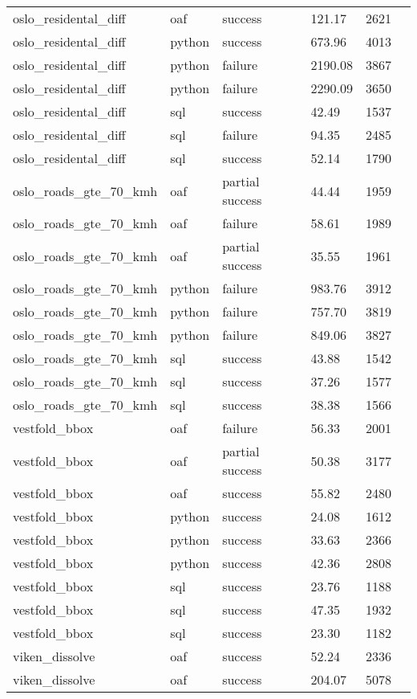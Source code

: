 \begin{longtable}{lp{1.8cm}p{1.8cm}p{1.8cm}p{1.8cm}p{1.8cm}}
oslo\_residental\_diff & oaf & success & 121.17 & 2621 \\
oslo\_residental\_diff & python & success & 673.96 & 4013 \\
oslo\_residental\_diff & python & failure & 2190.08 & 3867 \\
oslo\_residental\_diff & python & failure & 2290.09 & 3650 \\
oslo\_residental\_diff & sql & success & 42.49 & 1537 \\
oslo\_residental\_diff & sql & failure & 94.35 & 2485 \\
oslo\_residental\_diff & sql & success & 52.14 & 1790 \\
oslo\_roads\_gte\_70\_kmh & oaf & partial success & 44.44 & 1959 \\
oslo\_roads\_gte\_70\_kmh & oaf & failure & 58.61 & 1989 \\
oslo\_roads\_gte\_70\_kmh & oaf & partial success & 35.55 & 1961 \\
oslo\_roads\_gte\_70\_kmh & python & failure & 983.76 & 3912 \\
oslo\_roads\_gte\_70\_kmh & python & failure & 757.70 & 3819 \\
oslo\_roads\_gte\_70\_kmh & python & failure & 849.06 & 3827 \\
oslo\_roads\_gte\_70\_kmh & sql & success & 43.88 & 1542 \\
oslo\_roads\_gte\_70\_kmh & sql & success & 37.26 & 1577 \\
oslo\_roads\_gte\_70\_kmh & sql & success & 38.38 & 1566 \\
vestfold\_bbox & oaf & failure & 56.33 & 2001 \\
vestfold\_bbox & oaf & partial success & 50.38 & 3177 \\
vestfold\_bbox & oaf & success & 55.82 & 2480 \\
vestfold\_bbox & python & success & 24.08 & 1612 \\
vestfold\_bbox & python & success & 33.63 & 2366 \\
vestfold\_bbox & python & success & 42.36 & 2808 \\
vestfold\_bbox & sql & success & 23.76 & 1188 \\
vestfold\_bbox & sql & success & 47.35 & 1932 \\
vestfold\_bbox & sql & success & 23.30 & 1182 \\
viken\_dissolve & oaf & success & 52.24 & 2336 \\
viken\_dissolve & oaf & success & 204.07 & 5078 \\

\end{longtable}
